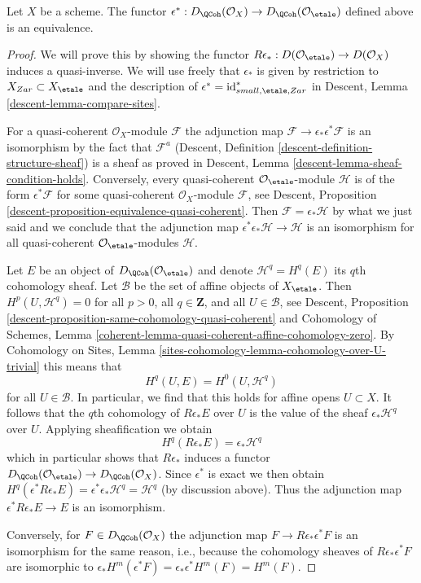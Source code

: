 \begin{lemma}
\label{lemma-derived-quasi-coherent-small-etale-site}
Let $X$ be a scheme. The functor
$\epsilon^* : D_\QCoh(\mathcal{O}_X) \to
D_\QCoh(\mathcal{O}_\etale)$
defined above is an equivalence.
\end{lemma}

\begin{proof}
We will prove this by showing the functor
$R\epsilon_* : D(\mathcal{O}_\etale) \to D(\mathcal{O}_X)$
induces a quasi-inverse. We will use freely that $\epsilon_*$
is given by restriction to $X_{Zar} \subset X_\etale$ and the description of
$\epsilon^* = \text{id}_{small, \etale, Zar}^*$
in Descent, Lemma \ref{descent-lemma-compare-sites}.

\medskip\noindent
For a quasi-coherent $\mathcal{O}_X$-module $\mathcal{F}$ the adjunction map
$\mathcal{F} \to \epsilon_*\epsilon^*\mathcal{F}$ is an isomorphism by
the fact that $\mathcal{F}^a$
(Descent, Definition \ref{descent-definition-structure-sheaf})
is a sheaf as proved in
Descent, Lemma \ref{descent-lemma-sheaf-condition-holds}.
Conversely, every quasi-coherent $\mathcal{O}_\etale$-module
$\mathcal{H}$ is of the form $\epsilon^*\mathcal{F}$ for some quasi-coherent
$\mathcal{O}_X$-module $\mathcal{F}$, see
Descent, Proposition \ref{descent-proposition-equivalence-quasi-coherent}.
Then $\mathcal{F} = \epsilon_*\mathcal{H}$ by what we just said and
we conclude that the adjunction map
$\epsilon^*\epsilon_*\mathcal{H} \to \mathcal{H}$ is an isomorphism for all
quasi-coherent $\mathcal{O}_\etale$-modules $\mathcal{H}$.

\medskip\noindent
Let $E$ be an object of $D_\QCoh(\mathcal{O}_\etale)$
and denote $\mathcal{H}^q = H^q(E)$ its $q$th cohomology
sheaf. Let $\mathcal{B}$ be the set of affine objects of $X_\etale$.
Then $H^p(U, \mathcal{H}^q) = 0$ for all $p > 0$, all $q \in \mathbf{Z}$,
and all $U \in \mathcal{B}$, see
Descent, Proposition \ref{descent-proposition-same-cohomology-quasi-coherent}
and
Cohomology of Schemes, Lemma
\ref{coherent-lemma-quasi-coherent-affine-cohomology-zero}.
By Cohomology on Sites, Lemma
\ref{sites-cohomology-lemma-cohomology-over-U-trivial}
this means that
$$
H^q(U, E) = H^0(U, \mathcal{H}^q)
$$
for all $U \in \mathcal{B}$. In particular, we find that this holds
for affine opens $U \subset X$. It follows that the $q$th cohomology of
$R\epsilon_*E$ over $U$ is the value of the sheaf $\epsilon_*\mathcal{H}^q$
over $U$. Applying sheafification we obtain
$$
H^q(R\epsilon_*E) = \epsilon_*\mathcal{H}^q
$$
which in particular shows that $R\epsilon_*$ induces a functor
$D_\QCoh(\mathcal{O}_\etale) \to D_\QCoh(\mathcal{O}_X)$.
Since $\epsilon^*$ is exact we then obtain
$H^q(\epsilon^*R\epsilon_*E) = \epsilon^*\epsilon_*\mathcal{H}^q =
\mathcal{H}^q$ (by discussion above). Thus the adjunction map
$\epsilon^*R\epsilon_*E \to E$ is an isomorphism.

\medskip\noindent
Conversely, for $F \in D_\QCoh(\mathcal{O}_X)$ the
adjunction map $F \to R\epsilon_*\epsilon^*F$
is an isomorphism for the same reason, i.e., because
the cohomology sheaves of $R\epsilon_*\epsilon^*F$
are isomorphic to
$\epsilon_*H^m(\epsilon^*F) = \epsilon_*\epsilon^*H^m(F) = H^m(F)$.
\end{proof}
